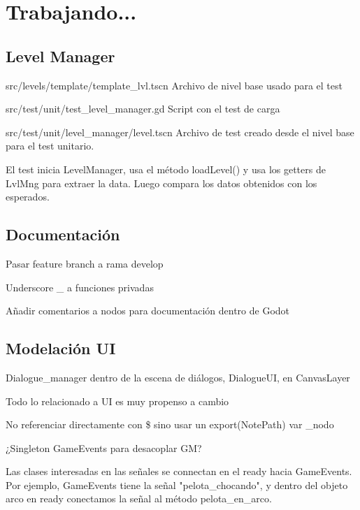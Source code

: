 
\section{Trabajando...}\label{Trabajando}

\subsection{Level Manager}

src/levels/template/template\_lvl.tscn Archivo de nivel base usado para el test

src/test/unit/test\_level\_manager.gd Script con el test de carga

src/test/unit/level\_manager/level.tscn Archivo de test creado desde el nivel
base para el test unitario.

El test inicia LevelManager, usa el método loadLevel() y usa los getters de
LvlMng para extraer la data. Luego compara los datos obtenidos con los
esperados.


\subsection{Documentación}

Pasar feature branch a rama develop

Underscore \_ a funciones privadas

Añadir comentarios a nodos para documentación dentro de Godot

\subsection{Modelación UI}

Dialogue\_manager dentro de la escena de diálogos, DialogueUI, en CanvasLayer

Todo lo relacionado a UI es muy propenso a cambio

No referenciar directamente con \$ sino usar un export(NotePath) var \_nodo

¿Singleton GameEvents para desacoplar GM?

Las clases interesadas en las señales se connectan en el ready hacia
GameEvents. Por ejemplo, GameEvents tiene la señal "pelota\_chocando", y dentro
del objeto arco en ready conectamos la señal al método pelota\_en\_arco. 

